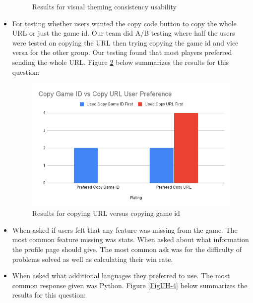 \documentclass[12pt, titlepage]{article}
\begin{document}
\begin{itemize}
\begin{figure}[H]
    \caption{Results for visual theming consistency usability}
    
    \label{FigUH-2}
    \end{figure}

    \item For testing whether users wanted the copy code button to copy the whole URL or just the game id. Our team did A/B testing where half the users were tested on copying the URL then trying copying the game id and vice versa for the other group. Our testing found that most players preferred sending the whole URL. Figure \ref{FigUH-3} below summarizes the results for this question:
    \begin{figure}[H]
    \centering
    \includegraphics[width=1\textwidth]{question3chart.png}
    
    \caption{Results for copying URL versus copying game id}
    
    \label{FigUH-3}
    \end{figure}

    \item When asked if users felt that any feature was missing from the game. The most common feature missing was stats. When asked about what information the profile page should give. The most common ask was for the difficulty of problems solved as well as calculating their win rate.

    \item When asked what additional languages they preferred to use. The most common response given was Python. Figure \ref{FigUH-4} below summarizes the results for this question:


\end{itemize}
\end{document}
